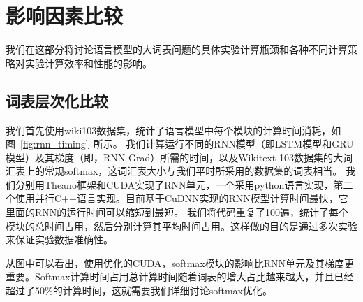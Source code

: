 \section{影响因素比较}
我们在这部分将讨论语言模型的大词表问题的具体实验计算瓶颈和各种不同计算策略对实验计算效率和性能的影响。
\subsection{词表层次化比较}
我们首先使用wiki103数据集，统计了语言模型中每个模块的计算时间消耗，如图~\ref{fig:rnn_timing}~所示。 我们计算运行不同的RNN模型（即LSTM模型和GRU模型）及其梯度（即，RNN Grad）所需的时间，以及Wikitext-103数据集的大词汇表上的常规softmax，这词汇表大小与我们平时所采用的数据集的词表相当。 我们分别用Theano框架和CUDA实现了RNN单元，一个采用python语言实现，第二个使用并行C++语言实现。目前基于CuDNN实现的RNN模型计算时间最快，它里面的RNN的运行时间可以缩短到最短。 我们将代码重复了100遍，统计了每个模块的总时间占用，然后分别计算其平均时间占用。这样做的目的是通过多次实验来保证实验数据准确性。

从图中可以看出，使用优化的CUDA，softmax模块的影响比RNN单元及其梯度更重要。Softmax计算时间占用总计算时间随着词表的增大占比越来越大，并且已经超过了$50\%$的计算时间，这就需要我们详细讨论softmax优化。


